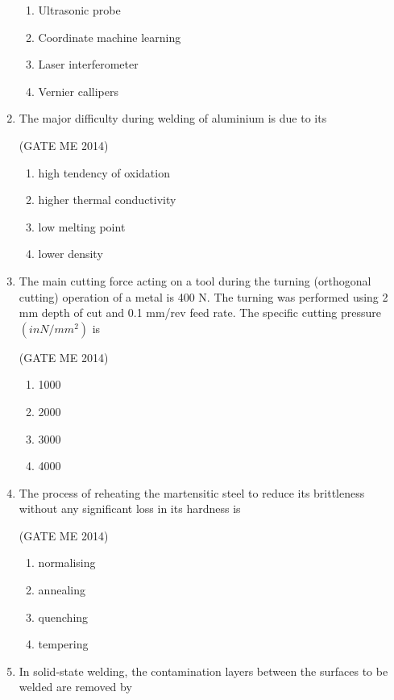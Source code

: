 \documentclass[journal]{IEEEtran}
\numberwithin{equation}{enumi}
\numberwithin{figure}{enumi}
\begin{document}
\begin{enumerate}
\begin{enumerate}
    \item Ultrasonic probe
    \item Coordinate machine learning
    \item Laser interferometer
    \item Vernier callipers
\end{enumerate}
\item The major difficulty during welding of aluminium is due to its

 \hfill{(GATE ME 2014)}
 
\begin{enumerate}
    \item high tendency of oxidation
    \item higher thermal conductivity
\item low melting point
\item lower density
\end{enumerate}

\item The main cutting force acting on a tool during the turning (orthogonal cutting) operation of a metal
is 400 N. The turning was performed using 2 mm depth of cut and 0.1 mm/rev feed rate. The
specific cutting pressure $(in N/mm^2)$ is

 \hfill{(GATE ME 2014)}
 
\begin{multicols}{4}
\begin{enumerate}
    \item 1000
    \item 2000
    \item 3000
    \item 4000
\end{enumerate}
\end{multicols}

\item The process of reheating the martensitic steel to reduce its brittleness without any significant loss in
its hardness is

 \hfill{(GATE ME 2014)}
 
\begin{multicols}{4}
    \begin{enumerate}
        \item normalising
        \item annealing
\item quenching
\item  tempering
 \end{enumerate}
\end{multicols}
\item In solid-state welding, the contamination layers between the surfaces to be welded are removed by


\end{enumerate}
\end{document}
